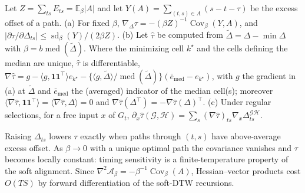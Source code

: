 \begin{proposition}\label{prop:gradll}
Let $Z=\sum_{ts}E_{ts}=\mathbb E_\beta|A|$ and let $Y(A)=\sum_{(t,s)\in A}(s-t-\tau)$ be the excess offset of a path.
(a) For fixed $\beta$, $\nabla_\Delta\tau=-(\beta Z)^{-1}\operatorname{Cov}_\beta(Y,A)$, and $|\partial\tau/\partial\Delta_{ts}|\le\operatorname{sd}_\beta(Y)/(2\beta Z)$.
(b) Let $\hat\tau$ be computed from $\tilde\Delta=\Delta-\min\Delta$ with $\beta=b\operatorname{med}(\tilde\Delta)$. Where the minimizing cell $k^\star$ and the cells defining the median are unique, $\hat\tau$ is differentiable,
$\nabla\hat\tau=g-\langle g,\mathbf 1\mathbf 1^\top\rangle e_{k^\star}-\{\langle g,\tilde\Delta\rangle/\operatorname{med}(\tilde\Delta)\}(\bar e_{\mathrm{med}}-e_{k^\star})$,
with $g$ the gradient in (a) at $\tilde\Delta$ and $\bar e_{\mathrm{med}}$ the (averaged) indicator of the median cell(s); moreover $\langle\nabla\hat\tau,\mathbf 1\mathbf 1^\top\rangle=\langle\nabla\hat\tau,\Delta\rangle=0$ and $\nabla\hat\tau(\Delta^\top)=-\nabla\hat\tau(\Delta)^\top$.
(c) Under regular selections, for a free input $x$ of $G_t$, $\partial_x\hat\tau(\mathcal G,\mathcal H)=\sum_s(\nabla\hat\tau)_{ts}\nabla_x\Delta^{\mathcal{GH}}_{ts}$.
\end{proposition}

Raising $\Delta_{ts}$ lowers $\tau$ exactly when paths through $(t,s)$ have above-average excess offset. As $\beta\to0$ with a unique optimal path the covariance vanishes and $\tau$ becomes locally constant: timing sensitivity is a finite-temperature property of the soft alignment. Since $\nabla^2\mathcal A_\beta=-\beta^{-1}\operatorname{Cov}_\beta(A)$, Hessian--vector products cost $O(TS)$ by forward differentiation of the soft-DTW recursions.

